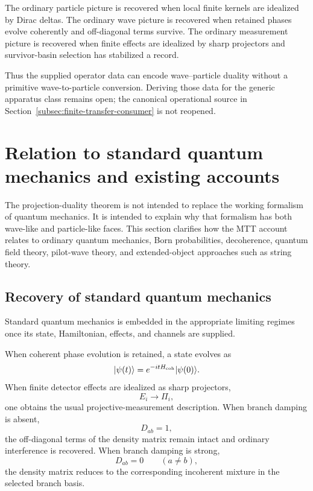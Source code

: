 \documentclass[11pt]{article}
\begin{document}
The ordinary particle picture is recovered when local finite kernels are idealized by Dirac
deltas. The ordinary wave picture is recovered when retained phases evolve coherently and
off-diagonal terms survive. The ordinary measurement picture is recovered when finite
effects are idealized by sharp projectors and survivor-basin selection has stabilized a record.

Thus the supplied operator data can encode wave--particle duality without a primitive
wave-to-particle conversion. Deriving those data for the generic apparatus class remains
open; the canonical operational source in Section~\ref{subsec:finite-transfer-consumer}
is not reopened.
\section{Relation to standard quantum mechanics and existing accounts}
\label{sec:relation-existing-accounts}

The projection-duality theorem is not intended to replace the working formalism of quantum
mechanics. It is intended to explain why that formalism has both wave-like and particle-like
faces. This section clarifies how the MTT account relates to ordinary quantum mechanics,
Born probabilities, decoherence, quantum field theory, pilot-wave theory, and extended-object
approaches such as string theory.

\subsection{Recovery of standard quantum mechanics}
\label{subsec:recovery-standard-qm}

Standard quantum mechanics is embedded in the appropriate limiting regimes once its state,
Hamiltonian, effects, and channels are supplied.

When coherent phase evolution is retained, a state evolves as
\begin{equation}
  |\psi(t)\rangle
  =
  e^{-itH_{\rm coh}}|\psi(0)\rangle.
  \label{eq:standard-unitary-recovery}
\end{equation}
When finite detector effects are idealized as sharp projectors,
\begin{equation}
  E_i\to \Pi_i,
  \label{eq:sharp-projector-recovery}
\end{equation}
one obtains the usual projective-measurement description. When branch damping is absent,
\begin{equation}
  D_{ab}=1,
\end{equation}
the off-diagonal terms of the density matrix remain intact and ordinary interference is
recovered. When branch damping is strong,
\begin{equation}
  D_{ab}=0
  \qquad
  (a\neq b),
\end{equation}
the density matrix reduces to the corresponding incoherent mixture in the selected branch
basis.
\end{document}
